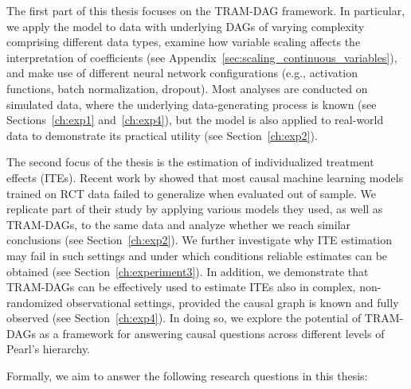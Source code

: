 The first part of this thesis focuses on the TRAM-DAG framework. In particular, we apply the model to data with underlying DAGs of varying complexity comprising different data types, examine how variable scaling affects the interpretation of coefficients (see Appendix~\ref{sec:scaling_continuous_variables}), and make use of different neural network configurations (e.g., activation functions, batch normalization, dropout). Most analyses are conducted on simulated data, where the underlying data-generating process is known (see Sections~\ref{ch:exp1} and~\ref{ch:exp4}), but the model is also applied to real-world data to demonstrate its practical utility (see Section~\ref{ch:exp2}).

The second focus of the thesis is the estimation of individualized treatment effects (ITEs). Recent work by \citet{chen2025} showed that most causal machine learning models trained on RCT data failed to generalize when evaluated out of sample. We replicate part of their study by applying various models they used, as well as TRAM-DAGs, to the same data and analyze whether we reach similar conclusions (see Section~\ref{ch:exp2}). We further investigate why ITE estimation may fail in such settings and under which conditions reliable estimates can be obtained (see Section~\ref{ch:experiment3}). In addition, we demonstrate that TRAM-DAGs can be effectively used to estimate ITEs also in complex, non-randomized observational settings, provided the causal graph is known and fully observed (see Section~\ref{ch:exp4}). In doing so, we explore the potential of TRAM-DAGs as a framework for answering causal questions across different levels of Pearl's hierarchy.

\medskip

Formally, we aim to answer the following research questions in this thesis:

